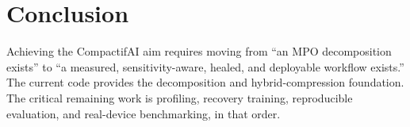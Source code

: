 \documentclass[11pt,a4paper]{article}
\begin{document}
\section{Conclusion}

Achieving the CompactifAI aim requires moving from ``an MPO decomposition
exists'' to ``a measured, sensitivity-aware, healed, and deployable workflow
exists.'' The current code provides the decomposition and hybrid-compression
foundation. The critical remaining work is profiling, recovery training,
reproducible evaluation, and real-device benchmarking, in that order.
\end{document}
